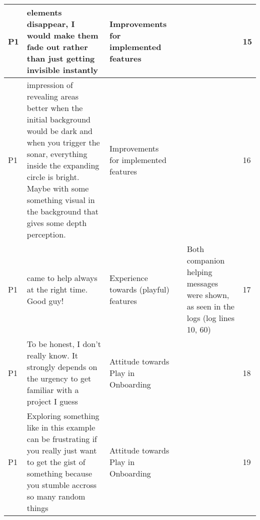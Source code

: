 \begin{appendices}
\begin{landscape}
\begin{longtable}{|p{0.8cm}|p{7cm}|p{3cm}|p{3cm}|p{5.5cm}|p{0.5cm}|}
      P1                   & elements disappear, I would make them fade out rather than just getting invisible instantly                                                                                                                                                                                 & Improvements for implemented features    &                                    &                                                                                                                                                    & 15           \\ \hline
      P1                   & impression of revealing areas better when the initial background would be dark and when you trigger the sonar, everything inside the expanding circle is bright. Maybe with some something visual in the background that gives some depth perception.                       & Improvements for implemented features    &                                    &                                                                                                                                                    & 16           \\ \hline
      P1                   & came to help always at the right time. Good guy!                                                                                                                                                                                                                            & Experience towards (playful) features    &                                    & Both companion helping messages were shown, as seen in the logs (log lines 10, 60)                                                                 & 17           \\ \hline
      P1                   & To be honest, I don't really know. It strongly depends on the urgency to get familiar with a project I guess                                                                                                                                                                & Attitude towards Play in Onboarding      &                                    &                                                                                                                                                    & 18           \\ \hline
      P1                   & Exploring something like in this example can be frustrating if you really just want to get the gist of something because you stumble accross so many random things                                                                                                          & Attitude towards Play in Onboarding      &                                    &                                                                                                                                                    & 19           \\ \hline

\end{longtable}
\end{landscape}
\end{appendices}
